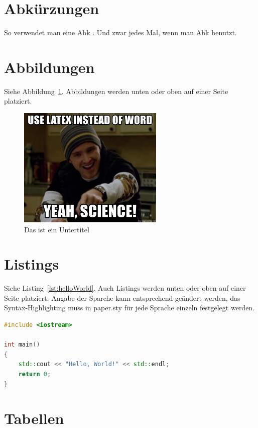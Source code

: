 \documentclass{iwi}
\begin{document}
\section{Abkürzungen} \label{sec:Abkürzungen}

So verwendet man eine \gls{Abk} . Und zwar jedes Mal, wenn man \gls{Abk} benutzt.

\section{Abbildungen} \label{sec:Abbildungen}

Siehe Abbildung~\ref{img:meme}. Abbildungen werden unten oder oben auf einer Seite platziert.

\begin{figure}
    \centering
    \includegraphics[width = 0.62\textwidth]{img/science.jpg}
    \caption{Das ist ein Untertitel}
    \label{img:meme}
\end{figure}

\section{Listings} \label{sec:Listings}

Siehe Listing~\ref{lst:helloWorld}. Auch Listings werden unten oder oben auf einer Seite platziert. 
Angabe der Sparche kann entsprechend geändert werden, das Syntax-Highlighting muss in paper.sty für jede Sprache einzeln festgelegt werden.


\begin{lstlisting}[float, caption={Hello, World!}, label={lst:helloWorld}, language=C++] 
#include <iostream>

int main() 
{
    std::cout << "Hello, World!" << std::endl;
    return 0;
}
\end{lstlisting}

\section{Tabellen} \label{sec:Tabellen}
\end{document}
